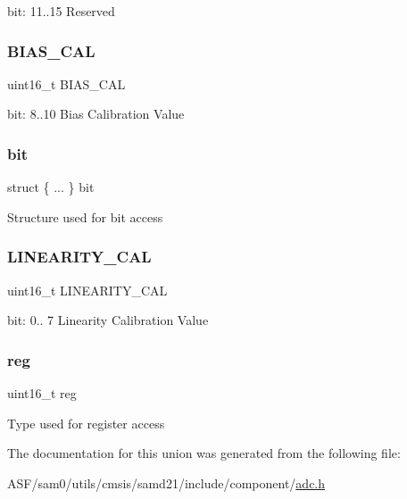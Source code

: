 bit\+: 11..15 Reserved \mbox{\label{union_a_d_c___c_a_l_i_b___type_a710bb4b0c041ddab2537978bef1b668e}} 
\subsubsection{\texorpdfstring{BIAS\_CAL}{BIAS\_CAL}}
{\footnotesize\ttfamily uint16\+\_\+t B\+I\+A\+S\+\_\+\+C\+AL}

bit\+: 8..10 Bias Calibration Value \mbox{\label{union_a_d_c___c_a_l_i_b___type_ab4f6c0d9754d1c7f29463e1c221e8ea9}} 
\subsubsection{\texorpdfstring{bit}{bit}}
{\footnotesize\ttfamily struct \{ ... \}   bit}

Structure used for bit access \mbox{\label{union_a_d_c___c_a_l_i_b___type_ad6f9c4e46b6d87e2a269d57c28f9da2b}} 
\subsubsection{\texorpdfstring{LINEARITY\_CAL}{LINEARITY\_CAL}}
{\footnotesize\ttfamily uint16\+\_\+t L\+I\+N\+E\+A\+R\+I\+T\+Y\+\_\+\+C\+AL}

bit\+: 0.. 7 Linearity Calibration Value \mbox{\label{union_a_d_c___c_a_l_i_b___type_a11760f5020019f4aa8cb02e694f7cc44}} 
\subsubsection{\texorpdfstring{reg}{reg}}
{\footnotesize\ttfamily uint16\+\_\+t reg}

Type used for register access 

The documentation for this union was generated from the following file\+:\begin{DoxyCompactItemize}
\item 
A\+S\+F/sam0/utils/cmsis/samd21/include/component/\mbox{\hyperlink{component_2adc_8h}{adc.\+h}}\end{DoxyCompactItemize}
